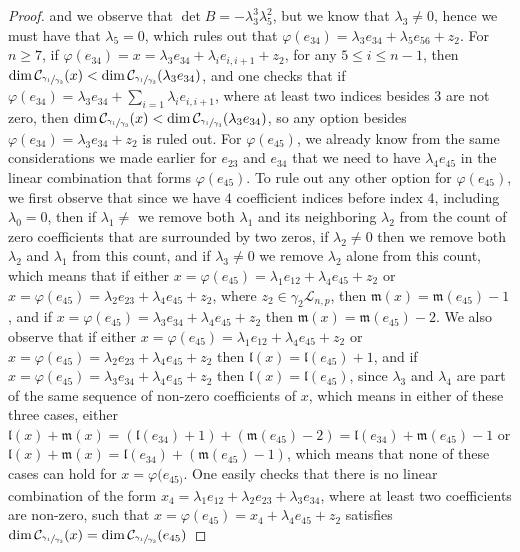 \documentclass[12pt,fleqn]{article}
\begin{document}
\begin{proof}
and we observe that $\det B=-\lambda_3^3\lambda_5^2$, but we know that $\lambda_3\neq 0$, hence we must have that $\lambda_5=0$, which rules out that $\varphi(e_{34})=\lambda_3 e_{34}+\lambda_5 e_{56}+z_2$. For $n\geq 7$, if $\varphi(e_{34})=x=\lambda_3 e_{34}+\lambda_i e_{i,i+1}+z_2$, for any $5\leq i\leq n-1$, then $\dim\mathcal{C}_{\sfrac{\gamma_1}{\gamma_3}}(x)<\dim\mathcal{C}_{\sfrac{\gamma_1}{\gamma_3}}(\lambda_3 e_{34})$, and one checks that if $\varphi(e_{34})=\lambda_3 e_{34}+\sum_{i=1}\lambda_i e_{i,i+1}$, where at least two indices besides $3$ are not zero, then $\dim\mathcal{C}_{\sfrac{\gamma_1}{\gamma_3}}(x)<\dim\mathcal{C}_{\sfrac{\gamma_1}{\gamma_3}}(\lambda_3 e_{34})$, so any option besides $\varphi(e_{34})=\lambda_3 e_{34}+z_2$ is ruled out. For $\varphi(e_{45})$, we already know from the same considerations we made earlier for $e_{23}$ and $e_{34}$ that we need to have $\lambda_4 e_{45}$ in the linear combination that forms $\varphi(e_{45})$. To rule out any other option for $\varphi(e_{45})$, we first observe that since we have $4$ coefficient indices before index $4$, including $\lambda_0=0$, then if $\lambda_1\neq$ we remove both $\lambda_1$ and its neighboring $\lambda_2$ from the count of zero coefficients that are surrounded by two zeros, if $\lambda_2\neq 0$ then we remove both $\lambda_2$ and $\lambda_1$ from this count, and if $\lambda_3\neq 0$ we remove $\lambda_2$ alone from this count, which means that if either $x=\varphi(e_{45})=\lambda_1 e_{12}+\lambda_4 e_{45}+z_2$ or $x=\varphi(e_{45})=\lambda_2 e_{23}+\lambda_4 e_{45}+z_2$, where $z_2\in\gamma_2\mathcal{L}_{n,p}$, then $\mathfrak{m}(x)=\mathfrak{m}(e_{45})-1$, and if $x=\varphi(e_{45})=\lambda_3 e_{34}+\lambda_4 e_{45}+z_2$ then $\mathfrak{m}(x)=\mathfrak{m}(e_{45})-2$. We also observe that if either $x=\varphi(e_{45})=\lambda_1 e_{12}+\lambda_4 e_{45}+z_2$ or $x=\varphi(e_{45})=\lambda_2 e_{23}+\lambda_4 e_{45}+z_2$ then $\mathfrak{l}(x)=\mathfrak{l}(e_{45})+1$, and if $x=\varphi(e_{45})=\lambda_3 e_{34}+\lambda_4 e_{45}+z_2$ then $\mathfrak{l}(x)=\mathfrak{l}(e_{45})$, since $\lambda_3$ and $\lambda_4$ are part of the same sequence of non-zero coefficients of $x$, which means in either of these three cases, either $\mathfrak{l}(x)+\mathfrak{m}(x)=(\mathfrak{l}(e_{34})+1)+(\mathfrak{m}(e_{45})-2)=\mathfrak{l}(e_{34})+\mathfrak{m}(e_{45})-1$ or $\mathfrak{l}(x)+\mathfrak{m}(x)=\mathfrak{l}(e_{34})+(\mathfrak{m}(e_{45})-1)$, which means that none of these cases can hold for $x=\varphi(e_{45)}$. One easily checks that there is no linear combination of the form $x_4=\lambda_1 e_{12}+\lambda_2 e_{23}+\lambda_3 e_{34}$, where at least two coefficients are non-zero, such that $x=\varphi(e_{45})=x_4+\lambda_4 e_{45}+z_2$ satisfies $\dim\mathcal{C}_{\sfrac{\gamma_1}{\gamma_3}}(x)=\dim\mathcal{C}_{\sfrac{\gamma_1}{\gamma_3}}(e_{45})$




\end{proof}
\end{document}
